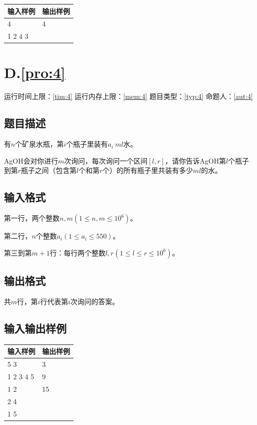 \documentclass[
	lang=cn,
	color=green
]{elegantbook}
\begin{document}
\begin{tabularx}{450pt}{X|X}
    \toprule
    输入样例 & 输出样例 \\
    \midrule
    4        & 4        \\
    1 2 4 3  &          \\
    \bottomrule
\end{tabularx}

\newpage
\chapter*{D.\quad  \ref*{pro:4}}
\begin{center}
    运行时间上限：\ref*{tim:4} \quad 运行内存上限：\ref*{mem:4} \quad 题目类型：\ref*{typ:4} \quad 命题人：\ref*{aut:4}
\end{center}

\section*{题目描述}
有$n$个矿泉水瓶，第$i$个瓶子里装有$a_i\ ml$水。

AgOH会对你进行$m$次询问，每次询问一个区间$[l,r]$，请你告诉AgOH第$l$个瓶子到第$r$瓶子之间（包含第$l$个和第$r$个）的所有瓶子里共装有多少$ml$的水。

\section*{输入格式}
第一行，两个整数$n,m(1 \leq n,m \leq 10^6)$。

第二行，$n$个整数$a_i(1 \leq a_i \leq 550)$。

第三到第$m+1$行：每行两个整数$l,r(1 \leq l \leq r \leq 10^6)$。

\section*{输出格式}
共$m$行，第$i$行代表第$i$次询问的答案。

\section*{输入输出样例}
\begin{tabularx}{450pt}{X|X}
    \toprule
    输入样例  & 输出样例 \\
    \midrule
    5 3       & 3        \\
    1 2 3 4 5 & 9        \\
    1 2       & 15       \\
    2 4       &          \\
    1 5       &          \\
    \bottomrule
\end{tabularx}
\end{document}
